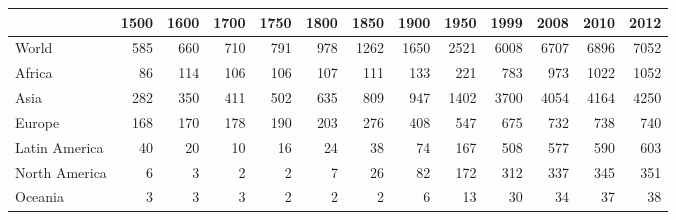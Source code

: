 \begin{tabular}{lrrrrrrrrrrrr}
\toprule
{} &  1500 &  1600 &  1700 &  1750 &  1800 &  1850 &  1900 &  1950 &  1999 &  2008 &  2010 &  2012 \\
\midrule
World         &   585 &   660 &   710 &   791 &   978 &  1262 &  1650 &  2521 &  6008 &  6707 &  6896 &  7052 \\
Africa        &    86 &   114 &   106 &   106 &   107 &   111 &   133 &   221 &   783 &   973 &  1022 &  1052 \\
Asia          &   282 &   350 &   411 &   502 &   635 &   809 &   947 &  1402 &  3700 &  4054 &  4164 &  4250 \\
Europe        &   168 &   170 &   178 &   190 &   203 &   276 &   408 &   547 &   675 &   732 &   738 &   740 \\
Latin America &    40 &    20 &    10 &    16 &    24 &    38 &    74 &   167 &   508 &   577 &   590 &   603 \\
North America &     6 &     3 &     2 &     2 &     7 &    26 &    82 &   172 &   312 &   337 &   345 &   351 \\
Oceania       &     3 &     3 &     3 &     2 &     2 &     2 &     6 &    13 &    30 &    34 &    37 &    38 \\
\bottomrule
\end{tabular}
